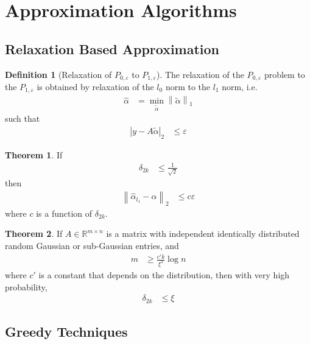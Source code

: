 \documentclass[titlepage, fleqn, a4paper, 12pt, twoside]{article}
\theoremstyle{definition}
\newtheorem{definition}{Definition}
\theoremstyle{theorem}
\newtheorem{theorem}{Theorem}
\renewcommand{\tilde}{\widetilde}
\begin{document}
\section{Approximation Algorithms}
\label{sec:approximation_algorithms}

\subsection{Relaxation Based Approximation}

\begin{definition}[Relaxation of $P_{0,\varepsilon}$ to $P_{1,\varepsilon}$]
	The relaxation of the $P_{0,\varepsilon}$ problem to the $P_{1,\varepsilon}$ is obtained by relaxation of the $l_0$ norm to the $l_1$ norm, i.e.
	\begin{align*}
		\hat{\alpha} &= \min\limits_{\tilde{\alpha}} \left\| \tilde{\alpha} \right\|_1
	\end{align*}
	such that
	\begin{align*}
		\left| y - A \tilde{\alpha} \right|_2 &\le \varepsilon
	\end{align*}
\end{definition}

\begin{theorem}
	If
	\begin{align*}
		\delta_{2 k} &\le \frac{1}{\sqrt{2}}
	\end{align*}
	then
	\begin{align*}
		\left\| \hat{\alpha}_{l_1} - \alpha \right\|_2 &\le c \varepsilon
	\end{align*}
	where $c$ is a function of $\delta_{2 k}$.
\end{theorem}

\begin{theorem}
	If $A \in \mathbb{R}^{m \times n}$ is a matrix with independent identically distributed random Gaussian or sub-Gaussian entries, and
	\begin{align*}
		m &\ge \frac{c' k}{\xi^2} \log n
	\end{align*}
	where $c'$ is a constant that depends on the distribution, then with very high probability,
	\begin{align*}
		\delta_{2 k} &\le \xi
	\end{align*}
\end{theorem}

\subsection{Greedy Techniques}
\end{document}
